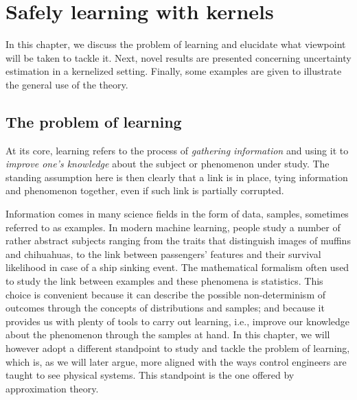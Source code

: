 \cleardoublepage
\chapter{Safely learning with kernels}

In this chapter, we discuss the problem of learning and elucidate what viewpoint will be taken to tackle it. Next, novel results are presented concerning uncertainty estimation in a kernelized setting. Finally, some examples are given to illustrate the general use of the theory.

\section{The problem of learning}

At its core, learning refers to the process of \textit{gathering information} and using it to \textit{improve one's knowledge} about the subject or phenomenon under study. The standing assumption here is then clearly that a link is in place, tying information and phenomenon together, even if such link is partially corrupted.

Information comes in many science fields in the form of data, samples, sometimes referred to as examples. In modern machine learning, people study a number of rather abstract subjects ranging from the traits that distinguish images of muffins and chihuahuas, to the link between passengers' features and their survival likelihood in case of a ship sinking event.  The mathematical formalism often used to study the link between examples and these phenomena is statistics. This choice is convenient because it can describe the possible non-determinism of outcomes through the concepts of distributions and samples; and because it provides us with plenty of tools to carry out learning, i.e., improve our knowledge about the phenomenon through the samples at hand. In this chapter, we will however adopt a different standpoint to study and tackle the problem of learning, which is, as we will later argue, more aligned with the ways control engineers are taught to see physical systems. This standpoint is the one offered by approximation theory.


